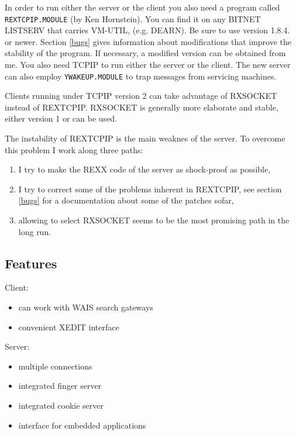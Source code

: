 In order to run either the server or the client you also need a program
called {\tt REXTCPIP.MODULE} (by Ken Hornstein).  You can find it on any
{\sf BITNET LISTSERV} that carries {\sf VM-UTIL}, (e.g. {\sf DEARN}).
Be sure to use version 1.8.4. or newer.  Section \ref{bugs} gives
information about modifications that improve the stability of the
program.  If necessary, a modified version can be obtained from me.
You also need TCPIP to run either the server or the client.
The new server can also employ {\tt YWAKEUP.MODULE} to trap messages
from servicing machines.

Clients running under TCPIP version 2 can take advantage of RXSOCKET
instead of REXTCPIP.  RXSOCKET is generally more elaborate and
stable, either version 1 or can be used.

The instability of REXTCPIP is the main weaknes of the server.
To overcome this problem I work along three paths:
\begin{enumerate}
\item   I try to make the REXX code of the server as shock-proof
        as possible,
\item   I try to correct some of the problems inherent in
        REXTCPIP, see section \ref{bugs} for a documentation
        about some of the patches sofar,
\item   allowing to select RXSOCKET seems to be the most
        promising path in the long run.
\end{enumerate}
 


\subsection{Features}

\noindent Client:
\noindent\begin{itemize}
\item can work with WAIS search gateways
\item convenient XEDIT interface
\end{itemize}

\noindent Server:
\noindent\begin{itemize}
\item multiple connections
\item integrated finger server
\item integrated cookie server
\item interface for embedded applications
\end{itemize}

